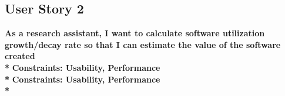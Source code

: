 \documentclass{article}
\begin{document}
\subsection{User Story 2} %

\noindent \textbf {As a research assistant, I want to calculate software utilization growth/decay rate so that I can estimate the value of the software created\\*}
\newline 
\noindent \textbf {Constraints:  Usability, Performance\\*}
\newline
\noindent \textbf {Constraints:  Usability, Performance\\*}
\begin{flushleft}
\hrulefill
\end{flushleft}
\end{document}
